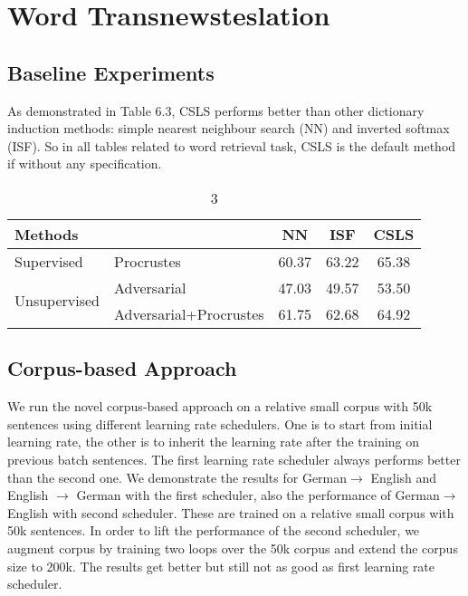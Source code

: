 \section{Word Transnewsteslation}
\subsection{Baseline Experiments}
 As demonstrated in Table 6.3, CSLS performs better than other dictionary induction methods: simple nearest neighbour search (NN) and inverted softmax (ISF). So in all tables related to word retrieval task, CSLS is the default method if without any specification.

\begin{table}[H]
	\centering
	\begin{tabular}{llccc}
		\hline
		\multicolumn{2}{l}{Methods}                           & NN    & ISF   & CSLS  \\ \hline
		Supervised                    & Procrustes             & 60.37 & 63.22 & 65.38 \\ \hline
		\multirow{2}{*}{Unsupervised} & Adversarial            & 47.03 & 49.57 & 53.50 \\ \cline{2-5} 
		& Adversarial+Procrustes & 61.75 & 62.68 & 64.92 \\ \hline
	\end{tabular}
	\caption{3}
\end{table}


\subsection{Corpus-based Approach}
We run the novel corpus-based approach on a relative small corpus with 50k sentences using different learning rate schedulers. One is to start from initial learning rate, the other is to inherit the learning rate after the training on previous batch sentences. The first learning rate scheduler always performs better than the second one. We demonstrate the results for German$\rightarrow$ English and English $\rightarrow$ German with the first scheduler, also the performance of  German$\rightarrow$ English with second scheduler. These are trained on a relative small corpus with 50k sentences. In order to lift the performance of the second scheduler, we augment corpus by training two loops over the 50k corpus and extend the corpus size to 200k. The results get better but still not as good as first learning rate scheduler. 
